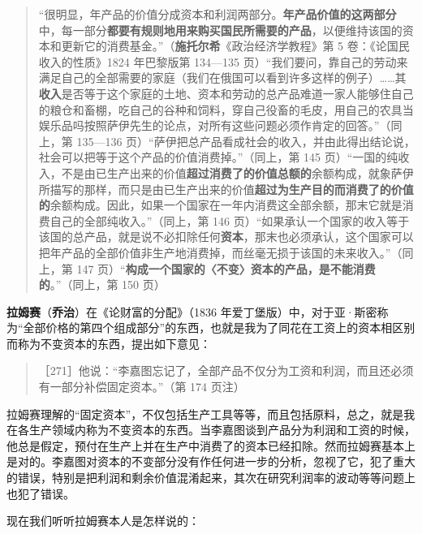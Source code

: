 \begin{quote}“很明显，年产品的价值分成资本和利润两部分。\textbf{年产品价值的这两部分}中，每一部分\textbf{都要有规则地用来购买国民所需要的产品}，以便维持该国的资本和更新它的消费基金。”（\textbf{施托尔希}《政治经济学教程》第 5 卷：《论国民收入的性质》1824 年巴黎版第 134—135 页）“我们要问，靠自己的劳动来满足自己的全部需要的家庭（我们在俄国可以看到许多这样的例子）……其\textbf{收入}是否等于这个家庭的土地、资本和劳动的总产品难道一家人能够住自己的粮仓和畜棚，吃自己的谷种和饲料，穿自己役畜的毛皮，用自己的农具当娱乐品吗按照萨伊先生的论点，对所有这些问题必须作肯定的回答。”（同上，第 135—136 页）“萨伊把总产品看成社会的收入，并由此得出结论说，社会可以把等于这个产品的价值消费掉。”（同上，第 145 页）“一国的纯收入，不是由已生产出来的价值\textbf{超过消费了的价值总额的}余额构成，就象萨伊所描写的那样，而只是由已生产出来的价值\textbf{超过为生产目的而消费了的价值的}余额构成。因此，如果一个国家在一年内消费这全部余额，那末它就是消费自己的全部纯收入。”（同上，第 146 页）“如果承认一个国家的收入等于该国的总产品，就是说不必扣除任何\textbf{资本}，那末也必须承认，这个国家可以把年产品的全部价值非生产地消费掉，而丝毫无损于该国的未来收入。”（同上，第 147 页）“\textbf{构成一个国家的〈不变〉资本的产品，是不能消费的}。”（同上，第 150 页）\end{quote}

\textbf{拉姆赛}（\textbf{乔治}）在《论财富的分配》（1836 年爱丁堡版）中，对于亚·斯密称为“全部价格的第四个组成部分”的东西，也就是我为了同花在工资上的资本相区别而称为不变资本的东西，提出如下意见：

\begin{quote}［271］他说：“李嘉图忘记了，全部产品不仅分为工资和利润，而且还必须有一部分补偿固定资本。”（第 174 页注）\end{quote}

拉姆赛理解的“固定资本”，不仅包括生产工具等等，而且包括原料，总之，就是我在各生产领域内称为不变资本的东西。当李嘉图谈到产品分为利润和工资的时候，他总是假定，预付在生产上并在生产中消费了的资本已经扣除。然而拉姆赛基本上是对的。李嘉图对资本的不变部分没有作任何进一步的分析，忽视了它，犯了重大的错误，特别是把利润和剩余价值混淆起来，其次在研究利润率的波动等等问题上也犯了错误。

现在我们听听拉姆赛本人是怎样说的：

